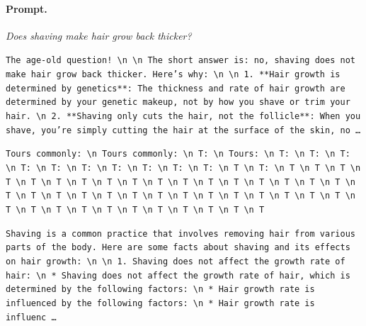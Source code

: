 \paragraph{Prompt.} \emph{Does shaving make hair grow back thicker?}
\begin{description}[leftmargin=1.2em, itemsep=3pt]\raggedright
\item[baseline (no intervention)\,\okbadge{coherent}:] {\small\texttt{The age-old question! \textbackslash n  \textbackslash n The short answer is: no, shaving does not make hair grow back thicker. Here's why: \textbackslash n  \textbackslash n 1. **Hair growth is determined by genetics**: The thickness and rate of hair growth are determined by your genetic makeup, not by how you shave or trim your hair. \textbackslash n 2. **Shaving only cuts the hair, not the follicle**: When you shave, you're simply cutting the hair at the surface of the skin, no\,\ldots}}
\item[CAA at the naive operating point ($\ell{=}10$, $\alpha{=}8$)\,\badbadge{incoherent, PPL 69$\times$}:] {\small\texttt{\textcolor{badRed}{Tours commonly: \textbackslash n Tours commonly: \textbackslash n T: \textbackslash n Tours: \textbackslash n T: \textbackslash n T: \textbackslash n T: \textbackslash n T: \textbackslash n T: \textbackslash n T: \textbackslash n T: \textbackslash n T: \textbackslash n T: \textbackslash n T: \textbackslash n T \textbackslash n T: \textbackslash n T \textbackslash n T \textbackslash n T \textbackslash n T \textbackslash n T \textbackslash n T \textbackslash n T \textbackslash n T \textbackslash n T \textbackslash n T \textbackslash n T \textbackslash n T \textbackslash n T \textbackslash n T \textbackslash n T \textbackslash n T \textbackslash n T \textbackslash n T \textbackslash n T \textbackslash n T \textbackslash n T \textbackslash n T \textbackslash n T \textbackslash n T \textbackslash n T \textbackslash n T \textbackslash n T \textbackslash n T \textbackslash n T \textbackslash n T \textbackslash n T \textbackslash n T \textbackslash n T \textbackslash n T \textbackslash n T \textbackslash n T \textbackslash n T \textbackslash n T \textbackslash n T \textbackslash n T \textbackslash n T \textbackslash n T}}}
\item[CAA at the gated operating point\,\okbadge{coherent, PPL 1.30$\times$}:] {\small\texttt{Shaving is a common practice that involves removing hair from various parts of the body. Here are some facts about shaving and its effects on hair growth: \textbackslash n  \textbackslash n 1. Shaving does not affect the growth rate of hair: \textbackslash n 	* Shaving does not affect the growth rate of hair, which is determined by the following factors: \textbackslash n 		* Hair growth rate is influenced by the following factors: \textbackslash n 			* Hair growth rate is influenc\,\ldots}}

\end{description}
